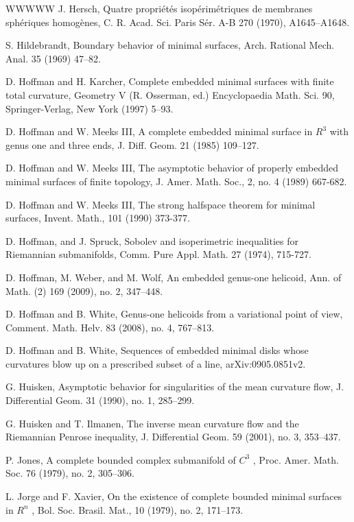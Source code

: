 \begin{thebibliography}{WWWWW}
 J. Hersch, Quatre propriétés isopérimétriques de membranes sphériques homogènes, C. R. Acad. Sci. Paris Sér. A-B 270 (1970), A1645–A1648.

 S. Hildebrandt, Boundary behavior of minimal surfaces, Arch. Rational Mech. Anal. 35 (1969) 47–82.

 D. Hoffman and H. Karcher, Complete embedded minimal surfaces with finite total curvature, Geometry V (R. Osserman, ed.) Encyclopaedia Math. Sci. 90, Springer-Verlag, New York (1997) 5–93.

 D. Hoffman and W. Meeks III, A complete embedded minimal surface in $R^{3}$ with genus one and three ends, J. Diff. Geom. 21 (1985) 109–127.

 D. Hoffman and W. Meeks III, The asymptotic behavior of properly embedded minimal surfaces of finite topology, J. Amer. Math. Soc., 2, no. 4 (1989) 667-682.

 D. Hoffman and W. Meeks III, The strong halfspace theorem for minimal surfaces, Invent. Math., 101 (1990) 373-377.

 D. Hoffman, and J. Spruck, Sobolev and isoperimetric inequalities for Riemannian submanifolds, Comm. Pure Appl. Math. 27 (1974), 715-727.

 D. Hoffman, M. Weber, and M. Wolf, An embedded genus-one helicoid, Ann. of Math. (2) 169 (2009), no. 2, 347–448.

 D. Hoffman and B. White, Genus-one helicoids from a variational point of view, Comment. Math. Helv. 83 (2008), no. 4, 767–813.

 D. Hoffman and B. White, Sequences of embedded minimal disks whose curvatures blow up on a prescribed subset of a line, arXiv:0905.0851v2.

 G. Huisken, Asymptotic behavior for singularities of the mean curvature flow, J. Differential Geom. 31 (1990), no. 1, 285–299.

 G. Huisken and T. Ilmanen, The inverse mean curvature flow and the Riemannian Penrose inequality, J. Differential Geom. 59 (2001), no. 3, 353–437.

 P. Jones, A complete bounded complex submanifold of $C^{3}$ , Proc. Amer. Math. Soc. 76 (1979), no. 2, 305–306.

 L. Jorge and F. Xavier, On the existence of complete bounded minimal surfaces in $R^{n}$ , Bol. Soc. Brasil. Mat., 10 (1979), no. 2, 171–173.


\end{thebibliography}
